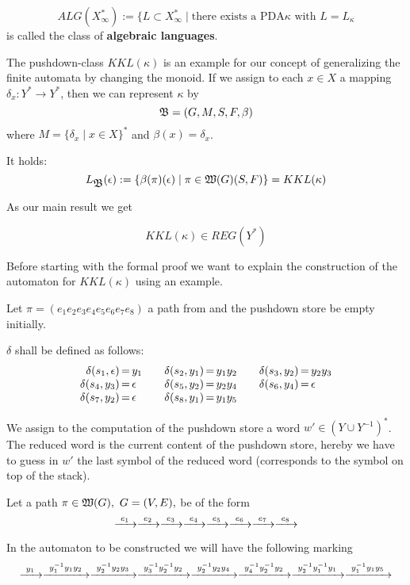 \begin{definition}
\[ ALG(X_\infty^*) := \{ L \subset X_\infty^* \mid \text{there exists a PDA
$\kappa$ with $L = L_\kappa$} \]
is called the class of {\bf algebraic languages}.
\end{definition}

The pushdown-class $KKL(\kappa)$ is an example for our concept of generalizing
the finite automata by changing the monoid. If we assign to each $x\in X$ a
mapping $\delta_x: Y^* \to Y^*$, then we can represent $\kappa$ by
\[ \mbox{$\mathfrak{B}$} = (G, M, S, F, \beta) \]
where $M = \{ \delta_x \mid x\in X \}^*$ and $\beta(x) = \delta_x$.

It holds:
\[ L_{\mbox{$\mathfrak{B}$}}(\epsilon) := \{ \beta(\pi)(\epsilon) \mid \pi \in
\mbox{$\mathfrak{W}(G)$}(S, F) \} = KKL(\kappa) \]

As our main result we get
\begin{theorem}
\[ KKL(\kappa) \in REG(Y^*) \]
\end{theorem}

Before starting with the formal proof we want to explain the construction of the
automaton for $KKL(\kappa)$ using an example.

Let $\pi = (e_1 e_2 e_3 e_4 e_5 e_6 e_7 e_8)$ a path from  and the
pushdown store be empty initially.

$\delta$ shall be defined as follows:
\[\begin{array}{r@{\,=\,}l@{\qquad}r@{\,=\,}l@{\qquad}r@{\,=\,}l}
\delta(s_1,\epsilon)&y_1 & \delta(s_2,y_1)&y_1y_2 & \delta(s_3,y_2)&y_2y_3 \\
\delta(s_4,y_3)&\epsilon & \delta(s_5,y_2)&y_2y_4 & \delta(s_6,y_4)&\epsilon \\
\delta(s_7,y_2)&\epsilon & \delta(s_8,y_1)&y_1y_5
\end{array}\]

We assign to the computation of the pushdown store a word $w' \in (Y\cup
Y^{-1})^*$. The reduced word is the current content of the pushdown store,
hereby we have to guess in $w'$ the last symbol of the reduced word
(corresponds to the symbol on top of the stack).

Let a path $\pi \in \pathcat{G},\ G=(V,E),$ be of the form
\[ \xrightarrow{\ {e_1}\ } \xrightarrow{\ {e_2}\ } \xrightarrow{\ {e_3}\ } \xrightarrow{\ {e_4}\ } \xrightarrow{\ {e_5}\ } \xrightarrow{\ {e_6}\ } \xrightarrow{\ {e_7}\ }
\xrightarrow{\ {e_8}\ } \]

In the automaton to be constructed we will have the following marking
\[ \xrightarrow{\ {y_1}\ } \xrightarrow{\ {y_1^{-1} y_1 y_2}\ } \xrightarrow{\ {y_2^{-1} y_2 y_3}\ } \xrightarrow{\ {y_3^{-1}
y_2^{-1} y_2}\ } \xrightarrow{\ {y_2^{-1} y_2 y_4}\ } \xrightarrow{\ {y_4^{-1} y_2^{-1} y_2}\ }
\xrightarrow{\ {y_2^{-1} y_1^{-1} y_1}\ } \xrightarrow{\ {y_1^{-1} y_1 y_5}\ }
\]

